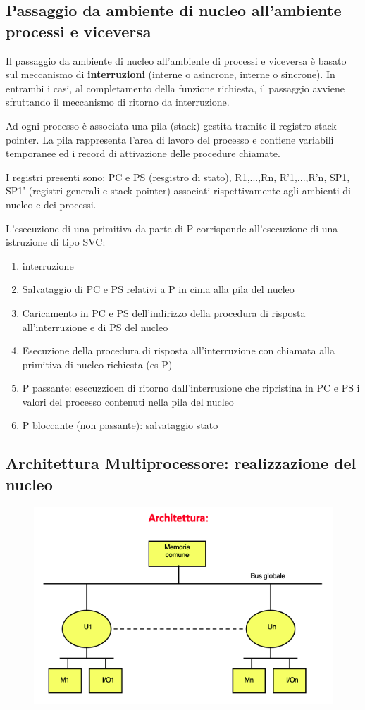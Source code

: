 \documentclass{article}
\begin{document}
\subsection{Passaggio da ambiente di nucleo all'ambiente processi e viceversa}

Il passaggio da ambiente di nucleo all'ambiente di processi e viceversa è basato sul meccanismo di \textbf{interruzioni}
(interne o asincrone, interne o sincrone). In entrambi i casi, al completamento della funzione richiesta, il passaggio
avviene sfruttando il meccanismo di ritorno da interruzione.

\vspace{3mm}
Ad ogni processo è associata una pila (stack) gestita tramite il registro stack pointer. La pila rappresenta l'area di lavoro
del processo e contiene variabili temporanee ed i record di attivazione delle procedure chiamate.

\vspace{3mm}
I registri presenti sono: PC e PS (resgistro di stato), R1,...,Rn, R'1,...,R'n, SP1, SP1' (registri generali e stack pointer)
associati rispettivamente agli ambienti di nucleo e dei processi.

\vspace{3mm}
L'esecuzione di una primitiva da parte di P corrisponde all'esecuzione di una istruzione di tipo SVC:
\begin{enumerate}
    \item interruzione
    \item Salvataggio di PC e PS relativi a P in cima alla pila del nucleo
    \item Caricamento in PC e PS dell'indirizzo della procedura di risposta all'interruzione e di PS del nucleo
    \item Esecuzione della procedura di risposta all'interruzione con chiamata alla primitiva di nucleo richiesta (es P)
    \item P passante: esecuzzioen di ritorno dall'interruzione che ripristina in PC e PS i valori del processo contenuti nella pila del nucleo
    \item P bloccante (non passante): salvataggio stato
\end{enumerate}

\subsection{Architettura Multiprocessore: realizzazione del nucleo}

\begin{figure}[htbp]
    \centering
    \includegraphics[width=0.60\columnwidth]{imgs/architettura.png}
\end{figure}
\end{document}
